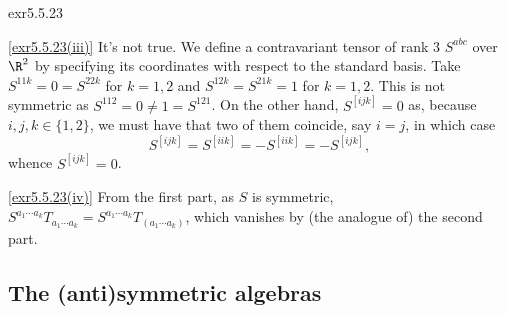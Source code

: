 \begin{exr}{}{exr5.5.23}
\begin{solution}
		\blni
		\cref{exr5.5.23(iii)} It's not true.  We define a contravariant tensor of rank $3$ $S^{abc}$ over $\R ^2$ by specifying its coordinates with respect to the standard basis.  Take $S^{11k}=0=S^{22k}$ for $k=1,2$ and $S^{12k}=S^{21k}=1$ for $k=1,2$.  This is not symmetric as $S^{112}=0\neq 1=S^{121}$.  On the other hand, $S^{[ijk]}=0$ as, because $i,j,k\in \{ 1,2\}$, we must have that two of them coincide, say $i=j$, in which case
		\begin{equation}
		S^{[ijk]}=S^{[iik]}=-S^{[iik]}=-S^{[ijk]},
		\end{equation}
		whence $S^{[ijk]}=0$.
		
		\blni
		\cref{exr5.5.23(iv)} From the first part, as $S$ is symmetric, $S^{a_1\cdots a_k}T_{a_1\cdots a_k}=S^{a_1\cdots a_k}T_{(a_1\cdots a_k)}$, which vanishes by (the analogue of) the second part.
	\end{solution}
\end{exr}

\subsection{The (anti)symmetric algebras}

